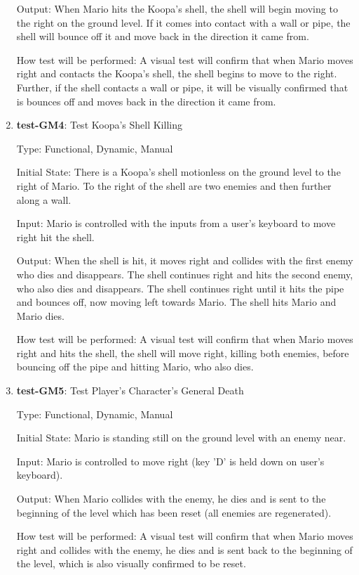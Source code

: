 \documentclass[12pt, titlepage]{article}
\begin{document}
\begin{enumerate}
Output: When Mario hits the Koopa's shell, the shell will begin moving to the right on the ground level. If it comes into contact with a wall or pipe, the shell will bounce off it and move back in the direction it came from.

How test will be performed: A visual test will confirm that when Mario moves right and contacts the Koopa's shell, the shell begins to move to the right. Further, if the shell contacts a wall or pipe, it will be visually confirmed that is bounces off and moves back in the direction it came from.

\item{\textbf{test-GM4}: Test Koopa's Shell Killing\\}

Type: Functional, Dynamic, Manual

Initial State: There is a Koopa's shell motionless on the ground level to the right of Mario. To the right of the shell are two enemies and then further along a wall.

Input: Mario is controlled with the inputs from a user's keyboard to move right hit the shell.

Output: When the shell is hit, it moves right and collides with the first enemy who dies and disappears. The shell continues right and hits the second enemy, who also dies and disappears. The shell continues right until it hits the pipe and bounces off, now moving left towards Mario. The shell hits Mario and Mario dies.

How test will be performed: A visual test will confirm that when Mario moves right and hits the shell, the shell will move right, killing both enemies, before bouncing off the pipe and hitting Mario, who also dies.

\item{\textbf{test-GM5}: Test Player's Character's General Death\\}

Type: Functional, Dynamic, Manual

Initial State: Mario is standing still on the ground level with an enemy near.

Input: Mario is controlled to move right (key 'D' is held down on user's keyboard).

Output: When Mario collides with the enemy, he dies and is sent to the beginning of the level which has been reset (all enemies are regenerated).

How test will be performed: A visual test will confirm that when Mario moves right and collides with the enemy, he dies and is sent back to the beginning of the level, which is also visually confirmed to be reset.


\end{enumerate}
\end{document}
